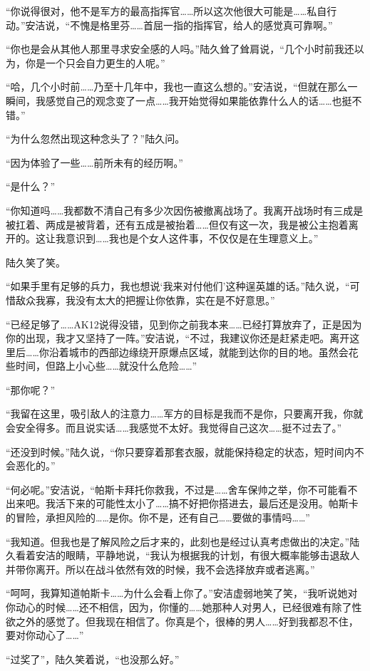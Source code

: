 “你说得很对，他不是军方的最高指挥官……所以这次他很大可能是……私自行动。”安洁说，“不愧是格里芬……首屈一指的指挥官，给人的感觉真可靠啊。”

“你也是会从其他人那里寻求安全感的人吗。”陆久耸了耸肩说，“几个小时前我还以为，你是一个只会自力更生的人呢。”

“哈，几个小时前……乃至十几年中，我也一直这么想的。”安洁说，“但就在那么一瞬间，我感觉自己的观念变了一点……我开始觉得如果能依靠什么人的话……也挺不错。”

“为什么忽然出现这种念头了？”陆久问。

“因为体验了一些……前所未有的经历啊。”

“是什么？”

“你知道吗……我都数不清自己有多少次因伤被撤离战场了。我离开战场时有三成是被扛着、两成是被背着，还有五成是被抬着……但仅有这一次，我是被公主抱着离开的。这让我意识到……我也是个女人这件事，不仅仅是在生理意义上。”

陆久笑了笑。

“如果手里有足够的兵力，我也想说‘我来对付他们’这种逞英雄的话。”陆久说，“可惜敌众我寡，我没有太大的把握让你依靠，实在是不好意思。”

“已经足够了……AK12说得没错，见到你之前我本来……已经打算放弃了，正是因为你的出现，我才又坚持了一阵。”安洁说，“不过，我建议你还是赶紧走吧。离开这里后……你沿着城市的西部边缘绕开原爆点区域，就能到达你的目的地。虽然会花些时间，但路上小心些……就没什么危险……”

“那你呢？”

“我留在这里，吸引敌人的注意力……军方的目标是我而不是你，只要离开我，你就会安全得多。而且说实话……我感觉不太好。我觉得自己这次……挺不过去了。”

“还没到时候。”陆久说，“你只要穿着那套衣服，就能保持稳定的状态，短时间内不会恶化的。”

“何必呢。”安洁说，“帕斯卡拜托你救我，不过是……舍车保帅之举，你不可能看不出来吧。我活下来的可能性太小了……搞不好把你搭进去，最后还是没用。帕斯卡的冒险，承担风险的……是你。你不是，还有自己……要做的事情吗……”

“我知道。但我也是了解风险之后才来的，此刻也是经过认真考虑做出的决定。”陆久看着安洁的眼睛，平静地说，“我认为根据我的计划，有很大概率能够击退敌人并带你离开。所以在战斗依然有效的时候，我不会选择放弃或者逃离。”

“呵呵，我算知道帕斯卡……为什么会看上你了。”安洁虚弱地笑了笑，“我听说她对你动心的时候……还不相信，因为，你懂的……她那种人对男人，已经很难有除了性欲之外的感觉了。但我现在相信了。你真是个，很棒的男人……好到我都忍不住，要对你动心了……”

“过奖了”，陆久笑着说，“也没那么好。”

